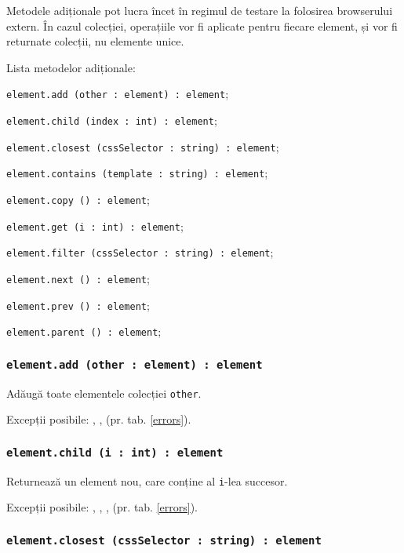 Metodele adiționale pot lucra încet în regimul de testare la folosirea browserului extern. În cazul colecției, operațiile vor fi aplicate pentru fiecare element, și vor fi returnate colecții, nu elemente unice. 

Lista metodelor adiționale:
\begin{icItems}
	\item \texttt{element.add (other : element) : element};
	\item \texttt{element.child (index : int) : element};
	\item \texttt{element.closest (cssSelector : string) : element};
	\item \texttt{element.contains (template : string) : element};
	\item \texttt{element.copy () : element};
	\item \texttt{element.get (i : int) : element};
	\item \texttt{element.filter (cssSelector : string) : element};
	\item \texttt{element.next () : element};
	\item \texttt{element.prev () : element};
	\item \texttt{element.parent () : element};
\end{icItems}

\subsubsection{\texttt{element.add (other : element) : element}}

Adăugă toate elementele colecției \texttt{other}.

Excepții posibile: , ,  (pr. tab. \ref{errors}).

\subsubsection{\texttt{element.child (i : int) : element}}

Returnează un element nou, care conține al \texttt{i}-lea succesor.

Excepții posibile: , , ,  (pr. tab. \ref{errors}).

\subsubsection{\texttt{element.closest (cssSelector : string) : element}}

